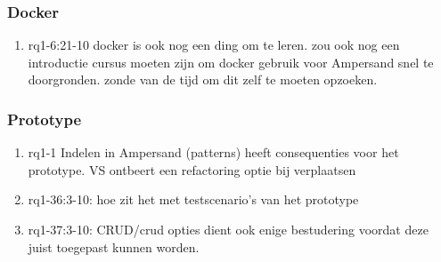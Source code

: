 \subsubsection{Docker}
\begin{comment}
plaats hier de afgehandelde items.
\end{comment}
\begin{enumerate}
    \item rq1-6:21-10 docker is ook nog een ding om te leren. zou ook nog een introductie cursus moeten zijn om docker gebruik voor Ampersand snel te doorgronden. zonde van de tijd om dit zelf te moeten opzoeken.

\end{enumerate}

\subsubsection{Prototype}
\begin{comment}
plaats hier de afgehandelde items.
\end{comment}
\begin{enumerate}
    \item rq1-1 Indelen in Ampersand (patterns) heeft consequenties voor het prototype. VS ontbeert een refactoring optie bij verplaatsen
    \item rq1-36:3-10: hoe zit het met testscenario's van het prototype
    \item rq1-37:3-10: CRUD/crud opties dient ook enige bestudering voordat deze juist toegepast kunnen worden.
\end{enumerate}

